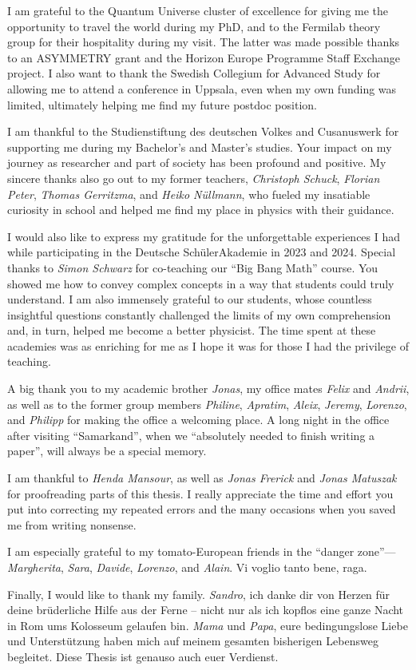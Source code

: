 I am grateful to the Quantum Universe cluster of excellence for giving me the opportunity to travel the world during my PhD, and to the Fermilab theory group for their hospitality during my visit. The latter was made possible thanks to an ASYMMETRY grant and the Horizon Europe Programme Staff Exchange project. I also want to thank the Swedish Collegium for Advanced Study for allowing me to attend a conference in Uppsala, even when my own funding was limited, ultimately helping me find my future postdoc position.

I am thankful to the Studienstiftung des deutschen Volkes and Cusanuswerk for supporting me during my Bachelor’s and Master’s studies. Your impact on my journey as researcher and part of society has been profound and positive. My sincere thanks also go out to my former teachers, \textit{Christoph Schuck}, \textit{Florian Peter}, \textit{Thomas Gerritzma}, and \textit{Heiko Nüllmann}, who fueled my insatiable curiosity in school and helped me find my place in physics with their guidance.

I would also like to express my gratitude for the unforgettable experiences I had while participating in the Deutsche SchülerAkademie in 2023 and 2024. Special thanks to \textit{Simon Schwarz} for co-teaching our “Big Bang Math” course. You showed me how to convey complex concepts in a way that students could truly understand. I am also immensely grateful to our students, whose countless insightful questions constantly challenged the limits of my own comprehension and, in turn, helped me become a better physicist. The time spent at these academies was as enriching for me as I hope it was for those I had the privilege of teaching.

A big thank you to my academic brother \textit{Jonas}, my office mates \textit{Felix} and \textit{Andrii}, as well as to the former group members \textit{Philine}, \textit{Apratim}, \textit{Aleix}, \textit{Jeremy}, \textit{Lorenzo}, and \textit{Philipp} for making the office a welcoming place. A long night in the office after visiting ``Samarkand'', when we ``absolutely needed to finish writing a paper'', will always be a special memory.

I am thankful to \textit{Henda Mansour}, as well as \textit{Jonas Frerick} and \textit{Jonas Matuszak} for proofreading parts of this thesis. I really appreciate the time and effort you put into correcting my repeated errors and the many occasions when you saved me from writing nonsense.

I am especially grateful to my tomato-European friends in the “danger zone”---\textit{Margherita}, \textit{Sara}, \textit{Davide}, \textit{Lorenzo}, and \textit{Alain}. Vi voglio tanto bene, raga.

Finally, I would like to thank my family. \textit{Sandro}, ich danke dir von Herzen für deine brüderliche Hilfe aus der Ferne -- nicht nur als ich kopflos eine ganze Nacht in Rom ums Kolosseum gelaufen bin. \textit{Mama} und \textit{Papa}, eure bedingungslose Liebe und Unterstützung haben mich auf meinem gesamten bisherigen Lebensweg begleitet. Diese Thesis ist genauso auch euer Verdienst.


\endgroup
